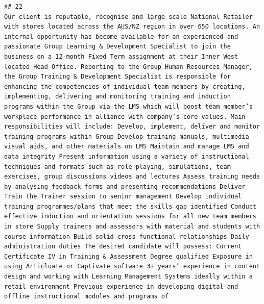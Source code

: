 \documentclass[11pt,a4paper,]{article}
\begin{document}
\begin{verbatim}
## 22                                                                                                                                                                                                                                                                                                                                                                                                                                                                                                                                                                                                                                                                                                                                                                                                                                                                                                                                                                                                                                                                                                                                                                                                                                                                                                                                                                                                                            Our client is reputable, recognise and large scale National Retailer with stores located across the AUS/NZ region in over 650 locations. An internal opportunity has become available for an experienced and passionate Group Learning & Development Specialist to join the business on a 12-month Fixed Term assignment at their Inner West located Head Office. Reporting to the Group Human Resources Manager, the Group Training & Development Specialist is responsible for enhancing the competencies of individual team members by creating, implementing, delivering and monitoring training and induction programs within the Group via the LMS which will boost team member’s workplace performance in alliance with company’s core values. Main responsibilities will include: Develop, implement, deliver and monitor training programs within Group Develop training manuals, multimedia visual aids, and other materials on LMS Maintain and manage LMS and data integrity Present information using a variety of instructional techniques and formats such as role playing, simulations, team exercises, group discussions videos and lectures Assess training needs by analysing feedback forms and presenting recommendations Deliver Train the Trainer session to senior management Develop individual training programmes/plans that meet the skills gap identified Conduct effective induction and orientation sessions for all new team members in store Supply trainers and assessors with material and students with course information Build solid cross-functional relationships Daily administration duties The desired candidate will possess: Current Certificate IV in Training & Assessment Degree qualified Exposure in using Articluate or Captivate software 3+ years’ experience in content design and working with Learning Management Systems ideally within a retail environment Previous experience in developing digital and offline instructional modules and programs of 
\end{verbatim}
\end{document}
